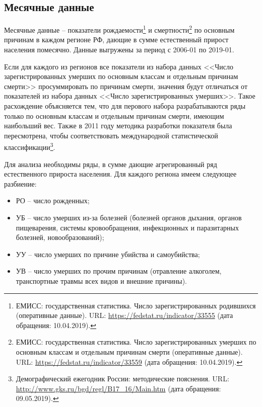 \documentclass[12pt,a4paper, oneside]{extreport}
\begin{document}
\subsection{Месячные данные}

Месячные данные -- показатели рождаемости\footnote{ЕМИСС: государственная статистика. Число зарегистрированных родившихся (оперативные данные). URL: \url{https://fedstat.ru/indicator/33555} (дата обращения: 10.04.2019).} и смертности\footnote{ЕМИСС: государственная статистика. Число зарегистрированных умерших по основным классам и отдельным причинам смерти (оперативные данные). URL: \url{https://fedstat.ru/indicator/33559} (дата обращения: 10.04.2019).} по основным причинам  в каждом регионе РФ, дающие в сумме естественный прирост населения помесячно. 
Данные выгружены за период с 2006-01 по 2019-01. 


Если для каждого из регионов все показатели из набора данных <<Число зарегистрированных умерших по основным классам и отдельным причинам смерти>> просуммировать по причинам смерти, значения будут отличаться от показателей  из набора данных <<Число зарегистрированных умерших>>. Такое расхождение объясняется тем, что для перового набора  разрабатываются ряды только по   основным классам и отдельным причинам смерти, имеющим наибольший вес. Также в 2011 году методика разработки показателя была пересмотрена, чтобы соответствовать  международной статистической классификации\footnote{Демографический ежегодник России: методические пояснения. URL: \url{http://www.gks.ru/bgd/regl/B17\_16/Main.htm} (дата обращения: 09.05.2019).}. 

Для анализа необходимы ряды, в сумме дающие агрегированный ряд естественного прироста населения. Для каждого региона имеем следующее разбиение:   



\begin{itemize}
	\item  РО --    число рожденных;
	\item  УБ --  число умерших  из-за болезней (болезней органов дыхания, органов пищеварения, системы кровообращения, инфекционных и паразитарных болезней, новообразований);
\item УУ --   число умерших по причине убийства и самоубийства;
\item УВ --    число умерших по прочим причинам (отравление алкоголем, транспортные травмы всех видов и внешние причины).

\end{itemize}
\end{document}
